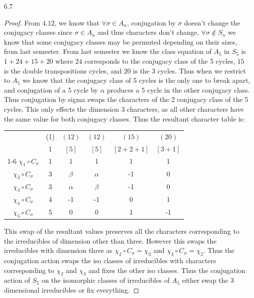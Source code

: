 \documentclass{article}
\begin{document}
\begin{PROB}{6.7}\label{Problem 6.7.}
\end{PROB}
\begin{proof}
    From $4.12$, we know that $\forall \sigma \in A_n$, conjugation by $\sigma$ doesn't change the conjugacy classes since $\sigma \in A_n$ and thus characters don't change. $\forall \sigma \not \in S_n$ we know that some conjugacy classes may be permuted depending on their sizes, from last semester. From last semester we know the class equation of $A_5$ in $S_5$ is $1 + 24 + 15 + 20$ where $24$ corresponds to the conjugacy class of the 5 cycles, $15$ is the double transpositions cycles, and $20$ is the 3 cycles. Thus when we restrict to $A_5$ we know that the conjugacy class of 5 cycles is the only one to break apart, and conjugation of a 5 cycle by $\alpha$ produces a 5 cycle in the other conjugacy class. Thus conjugation by sigma swaps the characters of the 2 conjugacy class of the 5 cycles. This only effects the dimension 3 characters, as all other characters have the same value for both conjugacy classes. Thus the resultant character table is: 


    \begin{tabular}{c | c c c c c }
        & (1) & $(12)$ & $(12)$ & $(15)$ & $(20)$   \\
        & 1 & $[5]$ & $[5]$ & $[2 + 2 + 1]$ & $[3 + 1]$   \\
        \cline{1-6}
        $\chi_{1} \circ C_\sigma$ & 1 & 1 & 1 & 1 & 1\\
        $\chi_{2} \circ C_\sigma$ & 3 & $\beta$ & $\alpha$ &  -1 & 0 \\
        $\chi_{3} \circ C_\sigma$ & 3 & $\alpha$  & $\beta$  & -1 & 0 \\
        $\chi_{4} \circ C_\sigma$ & 4 & -1 & -1 & 0 & 1 \\
        $\chi_{5} \circ C_\sigma$ & 5 & 0 & 0 & 1 & -1 \\
    \end{tabular}

    This swap of the resultant values preserves all the characters corresponding to the irreducibles of dimension other than three. However this swaps the irreducibles with dimension three as $\chi_2 \circ C_\sigma = \chi_3$ and $\chi_3 \circ C_\sigma = \chi_2$. Thus the conjugation action swaps the iso classes of irreducibles with characters corresponding to $\chi_2$ and $\chi_3$ and fixes the other iso classes. Thus the conjugation action of $S_5$ on the isomorphic classes of irreducibles of $A_5$ either swap the 3 dimensional irreducibles or fix everything.       
\end{proof}
\end{document}
